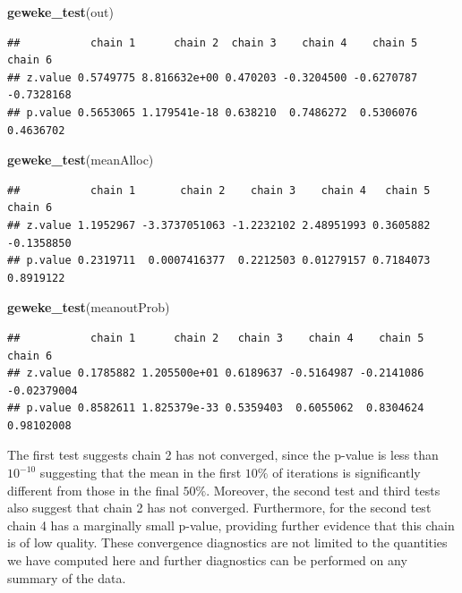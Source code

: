 \documentclass[
]{article}
\newenvironment{Shaded}{\begin{snugshade}}{\end{snugshade}}
\newcommand{\KeywordTok}[1]{\textcolor[rgb]{0.13,0.29,0.53}{\textbf{#1}}}
\newcommand{\NormalTok}[1]{#1}
\begin{document}
\begin{Shaded}
\begin{Highlighting}[]
\KeywordTok{geweke_test}\NormalTok{(out)}
\end{Highlighting}
\end{Shaded}

\begin{verbatim}
##           chain 1      chain 2  chain 3    chain 4    chain 5    chain 6
## z.value 0.5749775 8.816632e+00 0.470203 -0.3204500 -0.6270787 -0.7328168
## p.value 0.5653065 1.179541e-18 0.638210  0.7486272  0.5306076  0.4636702
\end{verbatim}

\begin{Shaded}
\begin{Highlighting}[]
\KeywordTok{geweke_test}\NormalTok{(meanAlloc)}
\end{Highlighting}
\end{Shaded}

\begin{verbatim}
##           chain 1       chain 2    chain 3    chain 4   chain 5    chain 6
## z.value 1.1952967 -3.3737051063 -1.2232102 2.48951993 0.3605882 -0.1358850
## p.value 0.2319711  0.0007416377  0.2212503 0.01279157 0.7184073  0.8919122
\end{verbatim}

\begin{Shaded}
\begin{Highlighting}[]
\KeywordTok{geweke_test}\NormalTok{(meanoutProb)}
\end{Highlighting}
\end{Shaded}

\begin{verbatim}
##           chain 1      chain 2   chain 3    chain 4    chain 5     chain 6
## z.value 0.1785882 1.205500e+01 0.6189637 -0.5164987 -0.2141086 -0.02379004
## p.value 0.8582611 1.825379e-33 0.5359403  0.6055062  0.8304624  0.98102008
\end{verbatim}

The first test suggests chain 2 has not converged, since the p-value is
less than \(10^{-10}\) suggesting that the mean in the first \(10\%\) of
iterations is significantly different from those in the final \(50\%\).
Moreover, the second test and third tests also suggest that chain 2 has
not converged. Furthermore, for the second test chain 4 has a marginally
small p-value, providing further evidence that this chain is of low
quality. These convergence diagnostics are not limited to the quantities
we have computed here and further diagnostics can be performed on any
summary of the data.
\end{document}
